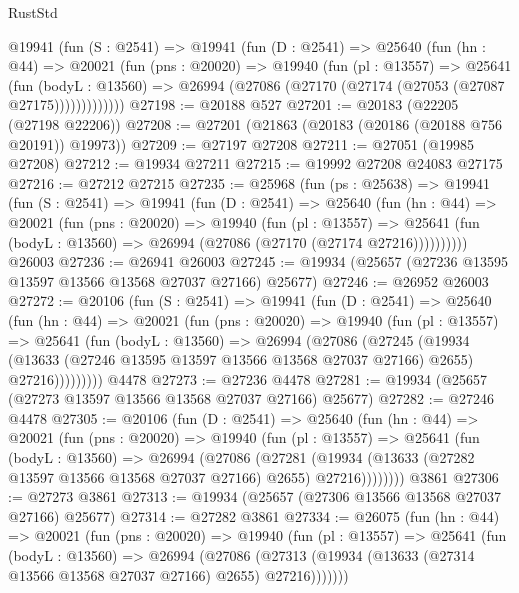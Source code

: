 \begin{lexlean}{RustStd}
\begin{coremodule}
      @19941
        (fun (S : @2541) =>
        @19941
          (fun (D : @2541) =>
          @25640
            (fun (hn : @44) =>
            @20021
              (fun (pns : @20020) =>
              @19940
                (fun (pl : @13557) =>
                @25641
                  (fun (bodyL : @13560) =>
                  @26994 (@27086 (@27170 (@27174 (@27053 (@27087 @27175)))))))))))))
@27198 := @20188 @527
@27201 := @20183 (@22205 (@27198 @22206))
@27208 := @27201 (@21863 (@20183 (@20186 (@20188 @756 @20191)) @19973))
@27209 := @27197 @27208
@27211 := @27051 (@19985 @27208)
@27212 := @19934 @27211
@27215 := @19992 @27208 @24083 @27175
@27216 := @27212 @27215
@27235 := @25968
    (fun (ps : @25638) =>
    @19941
      (fun (S : @2541) =>
      @19941
        (fun (D : @2541) =>
        @25640
          (fun (hn : @44) =>
          @20021
            (fun (pns : @20020) =>
            @19940
              (fun (pl : @13557) =>
              @25641 (fun (bodyL : @13560) => @26994 (@27086 (@27170 (@27174 @27216))))))))))
    @26003
@27236 := @26941 @26003
@27245 := @19934 (@25657 (@27236 @13595 @13597 @13566 @13568 @27037 @27166) @25677)
@27246 := @26952 @26003
@27272 := @20106
    (fun (S : @2541) =>
    @19941
      (fun (D : @2541) =>
      @25640
        (fun (hn : @44) =>
        @20021
          (fun (pns : @20020) =>
          @19940
            (fun (pl : @13557) =>
            @25641
              (fun (bodyL : @13560) =>
              @26994
                (@27086
                  (@27245
                    (@19934
                      (@13633 (@27246 @13595 @13597 @13566 @13568 @27037 @27166) @2655)
                      @27216)))))))))
    @4478
@27273 := @27236 @4478
@27281 := @19934 (@25657 (@27273 @13597 @13566 @13568 @27037 @27166) @25677)
@27282 := @27246 @4478
@27305 := @20106
    (fun (D : @2541) =>
    @25640
      (fun (hn : @44) =>
      @20021
        (fun (pns : @20020) =>
        @19940
          (fun (pl : @13557) =>
          @25641
            (fun (bodyL : @13560) =>
            @26994
              (@27086
                (@27281
                  (@19934 (@13633 (@27282 @13597 @13566 @13568 @27037 @27166) @2655) @27216))))))))
    @3861
@27306 := @27273 @3861
@27313 := @19934 (@25657 (@27306 @13566 @13568 @27037 @27166) @25677)
@27314 := @27282 @3861
@27334 := @26075
    (fun (hn : @44) =>
    @20021
      (fun (pns : @20020) =>
      @19940
        (fun (pl : @13557) =>
        @25641
          (fun (bodyL : @13560) =>
          @26994
            (@27086
              (@27313 (@19934 (@13633 (@27314 @13566 @13568 @27037 @27166) @2655) @27216)))))))

\end{coremodule}
\end{lexlean}
